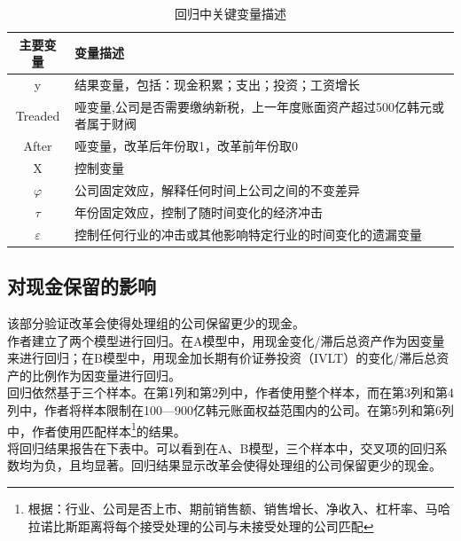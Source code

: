 \documentclass{article}
\begin{document}
\begin{table}[H]
\caption{回归中关键变量描述}
\begin{tabularx}{\textwidth}{cX}
\toprule
主要变量          & 变量描述                                  \\ \midrule
y             & 结果变量，包括：现金积累；支出；投资；工资增长               \\
Treaded       & 哑变量,公司是否需要缴纳新税，上一年度账面资产超过500亿韩元或者属于财阀 \\
After         & 哑变量，改革后年份取1，改革前年份取0                   \\
X             & 控制变量                                  \\
$\varphi$     & 公司固定效应，解释任何时间上公司之间的不变差异               \\
$\tau$        & 年份固定效应，控制了随时间变化的经济冲击                  \\
$\varepsilon$ & 控制任何行业的冲击或其他影响特定行业的时间变化的遗漏变量          \\ \bottomrule
\end{tabularx}
\end{table}

\subsection{对现金保留的影响}
\indent 该部分验证改革会使得处理组的公司保留更少的现金。\\
\indent 作者建立了两个模型进行回归。在A模型中，用现金变化/滞后总资产作为因变量来进行回归；在B模型中，用现金加长期有价证券投资（IVLT）的变化/滞后总资产的比例作为因变量进行回归。\\
\indent 回归依然基于三个样本。在第1列和第2列中，作者使用整个样本，而在第3列和第4列中，作者将样本限制在100—900亿韩元账面权益范围内的公司。在第5列和第6列中，作者使用匹配样本\footnote[1]{根据：行业、公司是否上市、期前销售额、销售增长、净收入、杠杆率、马哈拉诺比斯距离将每个接受处理的公司与未接受处理的公司匹配}的结果。\\
\indent 将回归结果报告在下表中。可以看到在A、B模型，三个样本中，交叉项的回归系数均为负，且均显著。回归结果显示改革会使得处理组的公司保留更少的现金。\\
\end{document}
